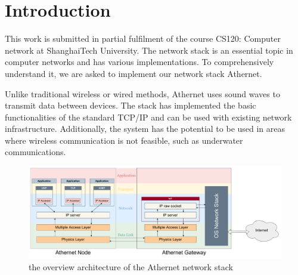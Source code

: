 \section{Introduction}
This work is submitted in partial fulfilment of the course CS120: Computer network at ShanghaiTech University. The network stack is an essential topic in computer networks and has various implementations. To comprehensively understand it, we are asked to implement our network stack Athernet. \par
Unlike traditional wireless or wired methods, Athernet uses sound waves to transmit data between devices. The stack has implemented the basic functionalities of the standard TCP/IP and can be used with existing network infrastructure. Additionally, the system has the potential to be used in areas where wireless communication is not feasible, such as underwater communications.\par
\begin{figure}[H]
  \begin{center}
    \centerline{\includegraphics[width=\columnwidth]{./figures/overview.pdf}}
    \caption{the overview architecture of the Athernet network stack}
    \label{overview}
  \end{center}
\end{figure}

